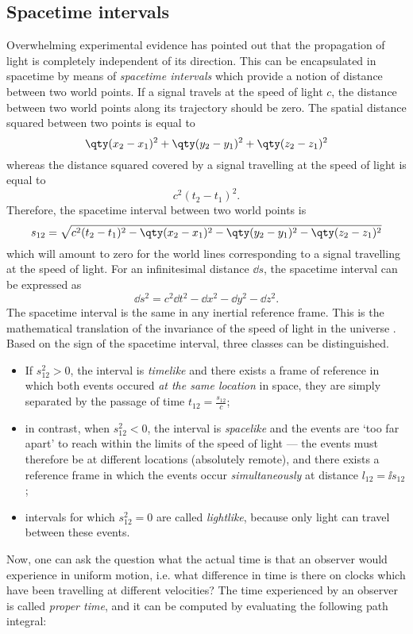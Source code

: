 \subsection{Spacetime intervals}
Overwhelming experimental evidence has pointed out that the propagation of light is completely independent of its direction. This can be encapsulated in spacetime by means of \emph{spacetime intervals} which provide a notion of distance between two world points. If a signal travels at the speed of light \(c\), the distance between two world points along its trajectory should be zero. The spatial distance squared between two points is equal to
\[ \qty(x_2 - x_1)^2 + \qty(y_2 - y_1)^2 + \qty(z_2 - z_1)^2 \]
whereas the distance squared covered by a signal travelling at the speed of light is equal to 
\[c^2(t_2 - t_1)^2. \]
Therefore, the spacetime interval between two world points is
\[
    s_{12} = \sqrt{c^2(t_2 - t_1)^2 - \qty(x_2 - x_1)^2 - \qty(y_2 - y_1)^2 - \qty(z_2 - z_1)^2}
\]
which will amount to zero for the world lines corresponding to a signal travelling at the speed of light. For an infinitesimal distance \(\dd{s}\), the spacetime interval can be expressed as
\[ \dd{s}^2 = c^2 \dd{t}^2 - \dd{x}^2 - \dd{y}^2 - \dd{z}^2.\]
The spacetime interval is the same in any inertial reference frame. This is the mathematical translation of the invariance of the speed of light in the universe \cite{Landau1971}. Based on the sign of the spacetime interval, three classes can be distinguished.
\begin{itemize}
    \item If \(s_{12}^2 > 0\), the interval is \emph{timelike} and there exists a frame of reference in which both events occured \emph{at the same location} in space, they are simply separated by the passage of time \(t_{12} = \frac{s_{12}}{c}\); 
    \item in contrast, when \(s_{12}^2 < 0\), the interval is \emph{spacelike} and the events are `too far apart' to reach within the limits of the speed of light --- the events must therefore be at different locations (absolutely remote), and there exists a reference frame in which the events occur \emph{simultaneously} at distance \(l_{12} = \ii s_{12}\);
    \item intervals for which \(s_{12}^2 = 0\) are called \emph{lightlike}, because only light can travel between these events.
\end{itemize}
Now, one can ask the question what the actual time is that an observer would experience in uniform motion, i.e. what difference in time is there on clocks which have been travelling at different velocities? The time experienced by an observer is called \emph{proper time}, and it can be computed by evaluating the following path integral:
